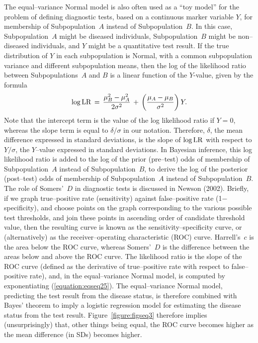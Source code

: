 \documentclass[a4paper,notitlepage]{article}      %
\begin{document}
The equal--variance Normal model is also often used as a ``toy model''
for the problem of defining diagnostic tests, based on a continuous marker variable $Y$,
for membership of Subpopulation~$A$ instead of Subpopulation~$B$.
In this case, Subpopulation~$A$ might be diseased individuals,
Subpopulation~$B$ might be non--diseased individuals,
and $Y$ might be a quantitative test result.
If the true distribution of $Y$ in each subpopulation is Normal,
with a common subpopulation variance and different subpopulation means,
then the log of the likelihood ratio between Subpopulations~$A$ and $B$ is a linear function of the $Y$-value,
given by the formula
\def\LR{{\rm LR}}
\begin{equation}
\log \LR \, = \, {{\mu_B^2 - \mu_A^2}\over{2 \sigma^2}} \, + \, \left( {{\mu_A-\mu_B}\over{\sigma^2}} \right) Y .
\label{equation:eqseq25}
\end{equation}
Note that the intercept term is the value of the log likelihood ratio if $Y=0$,
whereas the slope term is equal to $\delta/\sigma$ in our notation.
Therefore, $\delta$, the mean difference expressed in standard deviations,
is the slope of $\log \LR$ with respect to $Y/\sigma$,
the $Y$--value expressed in standard deviations.
In Bayesian inference, this log likelihood ratio is added to the log of the prior (pre--test) odds of membership
of Subpopulation~$A$ instead of Subpopulation~$B$,
to derive the log of the posterior (post--test) odds of membership
of Subpopulation~$A$ instead of Subpopulation~$B$.
The role of Somers'~$D$ in diagnostic tests is discussed in Newson (2002)\cite{newson2002}.
Briefly, if we graph true--positive rate (sensitivity) against false--positive rate (1$-$specificity),
and choose points on the graph corresponding to the various possible test thresholds,
and join these points in ascending order of candidate threshold value,
then the resulting curve is known as the sensitivity--specificity curve,
or (alternatively) as the receiver--operating characteristic (ROC) curve.
Harrell's~$c$ is the area below the ROC curve,
whereas Somers'~$D$ is the difference between the areas below and above the ROC curve.
The likelihood ratio is the slope of the ROC curve
(defined as the derivative of true--positive rate with respect to false--positive rate),
and, in the equal--variance Normal model, is computed by exponentiating (\ref{equation:eqseq25}).
The equal--variance Normal model, predicting the test result from the disease status,
is therefore combined with Bayes' theorem to imply a logistic regression model
for estimating the disease status from the test result.
Figure~\ref{figure:figseq3} therefore implies (unsurprisingly)
that, other things being equal,
the ROC curve becomes higher as the mean difference (in SDs) becomes higher.
\end{document}
